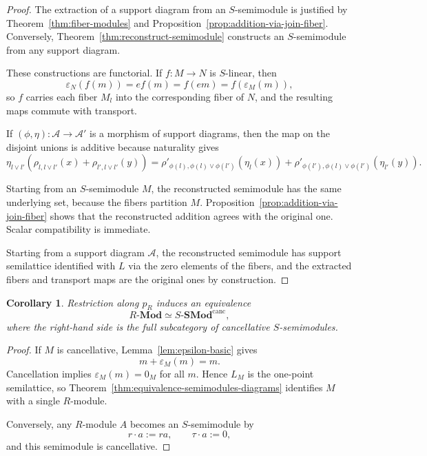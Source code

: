 \documentclass[11pt]{amsart}
\numberwithin{equation}{section}
\newtheorem{corollary}[theorem]{Corollary}
\theoremstyle{definition}
\newcommand{\SMod}{\mathbf{SMod}}
\newcommand{\Mod}{\mathbf{Mod}}
\begin{document}
\begin{proof}
The extraction of a support diagram from an $S$-semimodule is justified by Theorem~\ref{thm:fiber-modules} and Proposition~\ref{prop:addition-via-join-fiber}. Conversely, Theorem~\ref{thm:reconstruct-semimodule} constructs an $S$-semimodule from any support diagram.

These constructions are functorial. If $f:M\to N$ is $S$-linear, then
\[
\varepsilon_N(f(m))=ef(m)=f(em)=f(\varepsilon_M(m)),
\]
so $f$ carries each fiber $M_l$ into the corresponding fiber of $N$, and the resulting maps commute with transport.

If $(\phi,\eta):\mathcal A\to\mathcal A'$ is a morphism of support diagrams, then the map on the disjoint unions is additive because naturality gives
\[
\eta_{l\vee l'}(\rho_{l,l\vee l'}(x)+\rho_{l',l\vee l'}(y))
=
\rho'_{\phi(l),\phi(l)\vee\phi(l')}(\eta_l(x))
+
\rho'_{\phi(l'),\phi(l)\vee\phi(l')}(\eta_{l'}(y)).
\]

Starting from an $S$-semimodule $M$, the reconstructed semimodule has the same underlying set, because the fibers partition $M$. Proposition~\ref{prop:addition-via-join-fiber} shows that the reconstructed addition agrees with the original one. Scalar compatibility is immediate.

Starting from a support diagram $\mathcal A$, the reconstructed semimodule has support semilattice identified with $L$ via the zero elements of the fibers, and the extracted fibers and transport maps are the original ones by construction. 
\end{proof}

\begin{corollary}\label{cor:cancellative-category}
Restriction along $p_R$ induces an equivalence
\[
R\text{-}\Mod\simeq S\text{-}\SMod^{\mathrm{canc}},
\]
where the right-hand side is the full subcategory of cancellative $S$-semimodules.
\end{corollary}

\begin{proof}
If $M$ is cancellative, Lemma~\ref{lem:epsilon-basic} gives
\[
m+\varepsilon_M(m)=m.
\]
Cancellation implies $\varepsilon_M(m)=0_M$ for all $m$. Hence $L_M$ is the one-point semilattice, so Theorem~\ref{thm:equivalence-semimodules-diagrams} identifies $M$ with a single $R$-module.

Conversely, any $R$-module $A$ becomes an $S$-semimodule by
\[
r\cdot a:=ra,
\qquad
\tau\cdot a:=0,
\]
and this semimodule is cancellative. 
\end{proof}
\end{document}
